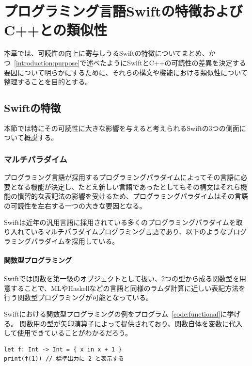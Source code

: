 \chapter{プログラミング言語Swiftの特徴およびC++との類似性}
\label{explain-swift}

本章では、可読性の向上に寄与しうるSwiftの特徴についてまとめ、かつ~\ref{introduction:purpose}で述べたようにSwiftとC++の可読性の差異を決定する要因について明らかにするために、それらの構文や機能における類似性について整理することを目的とする。

\section{Swiftの特徴}
\label{explain-swift:features}

本節では特にその可読性に大きな影響を与えると考えられるSwiftの3つの側面について概説する。

\subsection{マルチパラダイム}

プログラミング言語が採用するプログラミングパラダイムによってその言語に必要となる機能が決定し、たとえ新しい言語であったとしてもその構文はそれら機能の慣習的な表記法の影響を受けるため、プログラミングパラダイムはその言語の可読性を左右する一つの大きな要因となる。

Swiftは近年の汎用言語に採用されている多くのプログラミングパラダイムを取り入れているマルチパラダイムプログラミング言語であり、以下のようなプログラミングパラダイムを採用している。

\subsubsection{関数型プログラミング}

Swiftでは関数を第一級のオブジェクトとして扱い、2つの型から成る関数型を用意することで、MLやHaskellなどの言語と同様のラムダ計算に近しい表記方法を行う関数型プログラミングが可能となっている。

Swiftにおける関数型プログラミングの例をプログラム~\ref{code:functional}に挙げる。
関数用の型が矢印演算子によって提供されており、関数自体を変数に代入して使用できていることがわかるだろう。

\begin{lstlisting}[caption=Swiftにおける関数型プログラミングの例, label=code:functional]
let f: Int -> Int = { x in x + 1 }
print(f(1)) // 標準出力に 2 と表示する
\end{lstlisting}

